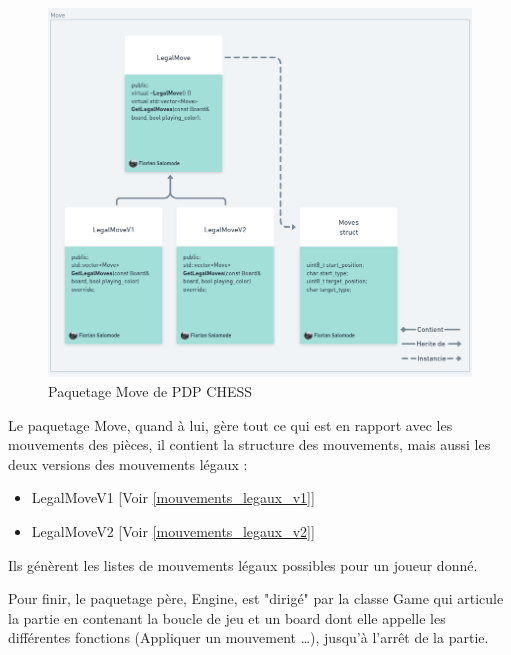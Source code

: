 \documentclass{article}
\begin{document}
\begin{figure}[!h]
    \centering
    \includegraphics[scale = 0.3]{img/Package/Move.png}
    \caption{Paquetage Move de PDP CHESS}
    \label{pck:move}
\end{figure}
Le paquetage Move, quand à lui, gère tout ce qui est en rapport avec les mouvements des pièces, il contient la structure des mouvements, mais aussi les deux versions des mouvements légaux :
\begin{itemize}
    \item LegalMoveV1 [Voir \ref{mouvements_legaux_v1}]
    \item LegalMoveV2 [Voir \ref{mouvements_legaux_v2}]
\end{itemize}
Ils génèrent les listes de mouvements légaux possibles pour un joueur donné.
\medskip

Pour finir, le paquetage père, Engine, est "dirigé" par la classe Game qui articule la partie en contenant la boucle de jeu et un board dont elle appelle les différentes fonctions (Appliquer un mouvement \dots), jusqu'à l'arrêt de la partie.
\end{document}
